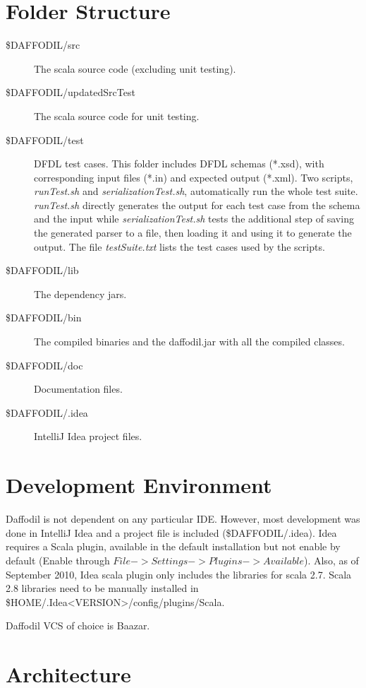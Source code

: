\documentclass[a4paper,10pt]{article}
\begin{document}
\section{Folder Structure}

\begin{description}
 \item [\$DAFFODIL/src] The scala source code (excluding unit testing).
 \item [\$DAFFODIL/updatedSrcTest] The scala source code for unit testing.
 \item [\$DAFFODIL/test] DFDL test cases. This folder includes DFDL schemas (*.xsd), with corresponding input files (*.in) and expected output (*.xml). Two scripts, \emph{runTest.sh} and \emph{serializationTest.sh}, automatically run the whole test suite. \emph{runTest.sh} directly generates the output for each test case from the schema and the input while \emph{serializationTest.sh} tests the additional step of saving the generated parser to a file, then loading it and using it to generate the output. The file \emph{testSuite.txt} lists the test cases used by the scripts.
 \item [\$DAFFODIL/lib] The dependency jars.
 \item [\$DAFFODIL/bin] The compiled binaries and the daffodil.jar with all the compiled classes.
 \item [\$DAFFODIL/doc] Documentation files.
\item [\$DAFFODIL/.idea] IntelliJ Idea project files.

\end{description}

\section{Development Environment}

Daffodil is not dependent on any particular IDE. However, most development was done in IntelliJ Idea and a project file is included (\$DAFFODIL/.idea).
Idea requires a Scala plugin, available in the default installation but not enable by default (Enable through $File -> Settings -> Plugins -> Available$).
Also, as of September 2010, Idea scala plugin only includes the libraries for scala 2.7. Scala 2.8 libraries need to be manually installed in
\$HOME/.Idea<VERSION>/config/plugins/Scala.


Daffodil VCS of choice is Baazar.

\section{Architecture}
\end{document}
